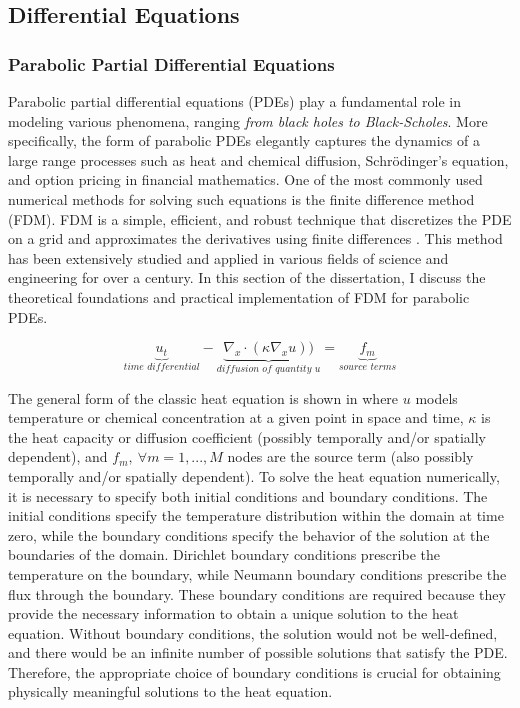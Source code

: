 \newpage
\subsection{Differential Equations}


\subsubsection{Parabolic Partial Differential Equations}

Parabolic partial differential equations (PDEs) play a fundamental role in modeling various phenomena, ranging \textit{from black holes to Black-Scholes}. More specifically, the form of parabolic PDEs elegantly captures the dynamics of a large range processes such as heat and chemical diffusion, Schrödinger's equation, and option pricing in financial mathematics. One of the most commonly used numerical methods for solving such equations is the finite difference method (FDM). FDM is a simple, efficient, and robust technique that discretizes the PDE on a grid and approximates the derivatives using finite differences \cite{leveque_fdm}. This method has been extensively studied and applied in various fields of science and engineering for over a century. In this section of the dissertation, I discuss the theoretical foundations and practical implementation of FDM for parabolic PDEs.

\begin{equation}\label{eq:heat}
    \underbrace{u_t}_{\textit{time differential}} - \underbrace{\nabla_x \cdot (\kappa \nabla_x u))}_{\textit{diffusion of quantity $u$}} = \underbrace{f_m}_{\textit{source terms}}
\end{equation}

The general form of the classic heat equation is shown in  where $u$ models temperature or chemical concentration at a given point in space and time, $\kappa$ is the heat capacity or diffusion coefficient (possibly temporally and/or spatially dependent), and $f_m, \ \forall m = 1, ..., M$ nodes are the source term (also possibly temporally and/or spatially dependent). To solve the heat equation numerically, it is necessary to specify both initial conditions and boundary conditions. The initial conditions specify the temperature distribution within the domain at time zero, while the boundary conditions specify the behavior of the solution at the boundaries of the domain. Dirichlet boundary conditions prescribe the temperature on the boundary, while Neumann boundary conditions prescribe the flux through the boundary. These boundary conditions are required because they provide the necessary information to obtain a unique solution to the heat equation. Without boundary conditions, the solution would not be well-defined, and there would be an infinite number of possible solutions that satisfy the PDE. Therefore, the appropriate choice of boundary conditions is crucial for obtaining physically meaningful solutions to the heat equation.

